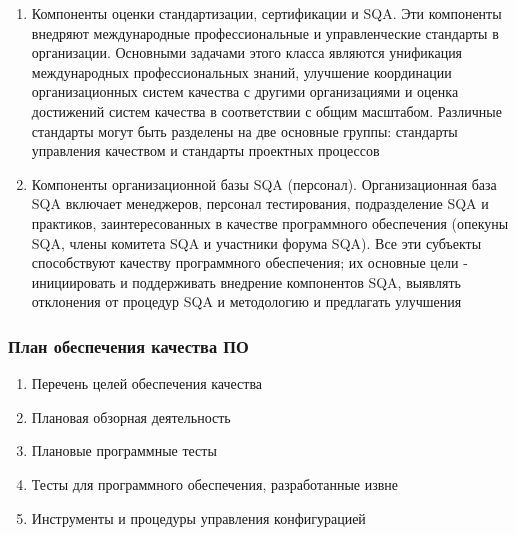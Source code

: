 \documentclass{../industrial-development}
\begin{document}
\begin{enumerate}
\item Компоненты оценки стандартизации, сертификации и SQA. Эти компоненты внедряют международные профессиональные и управленческие стандарты в организации. Основными задачами этого класса являются унификация международных профессиональных знаний, улучшение координации организационных систем качества с другими организациями и оценка достижений систем качества в соответствии с общим масштабом. Различные стандарты могут быть разделены на две основные группы: стандарты управления качеством и стандарты проектных процессов
\item Компоненты организационной базы SQA (персонал). Организационная база SQA включает менеджеров, персонал тестирования, подразделение SQA и практиков, заинтересованных в качестве программного обеспечения (опекуны SQA, члены комитета SQA и участники форума SQA). Все эти субъекты способствуют качеству программного обеспечения; их основные цели - инициировать и поддерживать внедрение компонентов SQA, выявлять отклонения от процедур SQA и методологию и предлагать улучшения~\cite[с.~57--58]{SQA-Galin}
  	\end{enumerate}



\begin{frame} \frametitle{План обеспечения качества ПО}
 	 \begin{enumerate}
\item Перечень целей обеспечения качества
\item Плановая обзорная деятельность
\item Плановые программные тесты
\item Тесты для программного обеспечения, разработанные извне
\item Инструменты и процедуры управления конфигурацией
  	\end{enumerate}
\end{frame}

\lecturenotes
\end{document}
